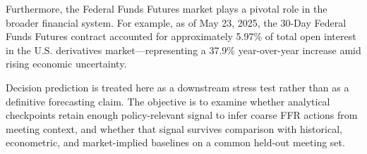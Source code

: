 Furthermore, the Federal Funds Futures market plays a pivotal role in the broader financial system. For example, as of May 23, 2025, the 30-Day Federal Funds Futures contract accounted for approximately 5.97\% of total open interest in the U.S. derivatives market—representing a 37.9\% year-over-year increase amid rising economic uncertainty.

Decision prediction is treated here as a downstream stress test rather than as a definitive forecasting claim. The objective is to examine whether analytical checkpoints retain enough policy-relevant signal to infer coarse FFR actions from meeting context, and whether that signal survives comparison with historical, econometric, and market-implied baselines on a common held-out meeting set.









